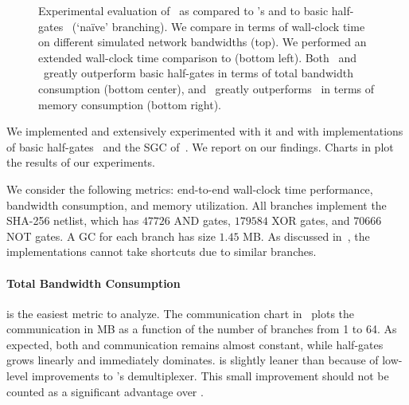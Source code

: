 \begin{figure}[t]
\begin{adjustwidth}{-0.13\textwidth}{-0.13\textwidth}
  \end{adjustwidth}
  \caption{%
    Experimental evaluation of \ourschemelong\ as compared to  \HK's
    \stack and to basic half-gates~\cite{EC:ZahRosEva15} (`na\"ive'
    branching).
    We compare in terms of wall-clock time on different simulated network
    bandwidths (top).
    We performed an extended wall-clock time comparison to \stack
    (bottom left).
    Both \ourschemelong\ and \stack\ greatly outperform basic
    half-gates in terms of total bandwidth consumption (bottom
    center), and \ourschemelong\ greatly outperforms \stack\ in terms
    of memory consumption (bottom right).
  }\label{fig:plots}
\end{figure}

We implemented \ourschemelong and extensively experimented with it and
with implementations of basic half-gates~\cite{EC:ZahRosEva15} and the
\stack SGC of~\HK.
We report on our findings.
Charts in  plot the results of our experiments.

We consider  the following metrics: end-to-end wall-clock time
performance, bandwidth consumption, and memory utilization.
All branches implement the SHA-256 netlist, which has $47726$ AND gates,
$179584$ XOR gates, and $70666$ NOT gates.
A GC for each branch has size $1.45$ MB.
As discussed
in~, the implementations cannot
take shortcuts due to similar branches.

\paragraph{Total Bandwidth Consumption}  is the easiest metric to analyze.
The communication chart in~ plots the communication in
MB as a function of the number of branches from 1 to 64.  As expected, both \stack and
\ourschemelong communication remains almost constant, while half-gates
grows linearly and immediately dominates.  \ourschemelong is slightly
leaner than \stack because of low-level improvements to
\ourschemelong's demultiplexer. This small improvement should not be counted
as a significant advantage over \stack.


